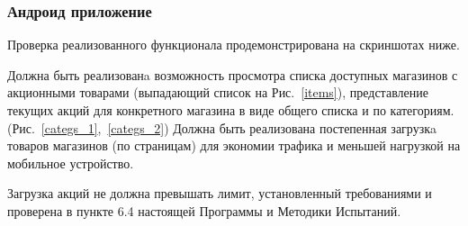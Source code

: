 \subsubsection{Андроид приложение}
Проверка реализованного функционала продемонстрирована на скриншотах ниже.

Должна быть реализованa возможность просмотра списка доступных магазинов с
акционными товарами (выпадающий список на Рис.~\ref{items}), представление текущих акций для конкретного магазина в
виде общего списка и по категориям. (Рис.~\ref{categs_1},~\ref{categs_2}) Должна быть реализована постепенная
загрузкa товаров магазинов (по страницам) для экономии трафика и меньшей
нагрузкой на мобильное устройство.

Загрузка акций не должна превышать лимит, установленный требованиями и проверена в
пункте 6.4 настоящей Программы и Методики Испытаний.

